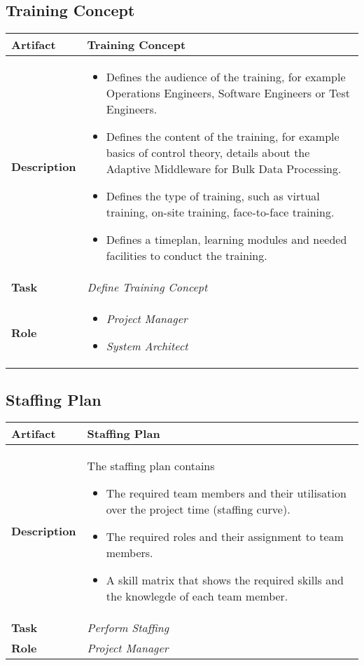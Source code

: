 \subsection{Training Concept}

\begin{tabularx}{\textwidth}{@{} l X @{}}
	\caption{Training Concept} \label{table:ch6_Artifact_Training_Concept}\\
	\toprule 
	\bfseries Artifact & Training Concept\\
	\midrule 
	\bfseries Description & 
	\begin{itemize}
		\item Defines the audience of the training, for example Operations Engineers, Software Engineers or Test Engineers.
		\item Defines the content of the training, for example basics of control theory, details about the Adaptive Middleware for Bulk Data Processing.
		\item Defines the type of training, such as virtual training, on-site training, face-to-face training. 
		\item Defines a timeplan, learning modules and needed facilities to conduct the training.
	\end{itemize}
	\\
	\midrule 
	\bfseries Task & \emph{Define Training Concept}
	\\
	\midrule 
	\bfseries Role & 
	\begin{itemize}
		\item \emph{Project Manager}
		\item \emph{System Architect}
	\end{itemize}
	\\
	\bottomrule 
\end{tabularx}


\subsection{Staffing Plan}

\begin{tabularx}{\textwidth}{@{} l X @{}}
	\caption{Training Concept} \label{table:ch6_Artifact_Staffing_Plan}\\
	\toprule 
	\bfseries Artifact & Staffing Plan\\
	\midrule 
	\bfseries Description & The staffing plan contains
	\begin{itemize}
		\item The required team members and their utilisation over the project time (staffing curve).
		\item The required roles and their assignment to team members.
		\item A skill matrix that shows the required skills and the knowlegde of each team member.
	\end{itemize}
	\\
	\midrule 
	\bfseries Task & \emph{Perform Staffing}
	\\
	\midrule 
	\bfseries Role & \emph{Project Manager}\\
	\bottomrule 
\end{tabularx}


